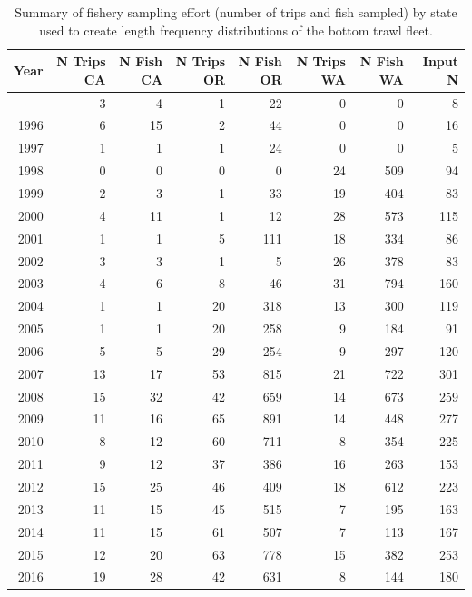 \documentclass[
  english,
]{article}
\begin{document}
\endgroup

\newpage{}

\begingroup
\fontsize{9.0pt}{11.0pt}\selectfont

\begin{longtable}{rrrrrrrr}

\caption{\label{tbl-BT_lengths_sample_sizes}Summary of fishery sampling
effort (number of trips and fish sampled) by state used to create length
frequency distributions of the bottom trawl fleet.}

\tabularnewline

\toprule
Year & N Trips CA & N Fish CA & N Trips OR & N Fish OR & N Trips WA & N Fish WA & Input N \\ 
\midrule\addlinespace[2.5pt]
1995 & 3 & 4 & 1 & 22 & 0 & 0 & 8 \\ 
1996 & 6 & 15 & 2 & 44 & 0 & 0 & 16 \\ 
1997 & 1 & 1 & 1 & 24 & 0 & 0 & 5 \\ 
1998 & 0 & 0 & 0 & 0 & 24 & 509 & 94 \\ 
1999 & 2 & 3 & 1 & 33 & 19 & 404 & 83 \\ 
2000 & 4 & 11 & 1 & 12 & 28 & 573 & 115 \\ 
2001 & 1 & 1 & 5 & 111 & 18 & 334 & 86 \\ 
2002 & 3 & 3 & 1 & 5 & 26 & 378 & 83 \\ 
2003 & 4 & 6 & 8 & 46 & 31 & 794 & 160 \\ 
2004 & 1 & 1 & 20 & 318 & 13 & 300 & 119 \\ 
2005 & 1 & 1 & 20 & 258 & 9 & 184 & 91 \\ 
2006 & 5 & 5 & 29 & 254 & 9 & 297 & 120 \\ 
2007 & 13 & 17 & 53 & 815 & 21 & 722 & 301 \\ 
2008 & 15 & 32 & 42 & 659 & 14 & 673 & 259 \\ 
2009 & 11 & 16 & 65 & 891 & 14 & 448 & 277 \\ 
2010 & 8 & 12 & 60 & 711 & 8 & 354 & 225 \\ 
2011 & 9 & 12 & 37 & 386 & 16 & 263 & 153 \\ 
2012 & 15 & 25 & 46 & 409 & 18 & 612 & 223 \\ 
2013 & 11 & 15 & 45 & 515 & 7 & 195 & 163 \\ 
2014 & 11 & 15 & 61 & 507 & 7 & 113 & 167 \\ 
2015 & 12 & 20 & 63 & 778 & 15 & 382 & 253 \\ 
2016 & 19 & 28 & 42 & 631 & 8 & 144 & 180 \\ 

\end{longtable}
\end{document}
